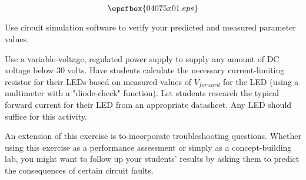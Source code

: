 

$$\epsfbox{04075x01.eps}$$

\vfil \eject






Use circuit simulation software to verify your predicted and measured parameter values.







Use a variable-voltage, regulated power supply to supply any amount of DC voltage below 30 volts.  Have students calculate the necessary current-limiting resistor for their LEDs based on measured values of $V_{forward}$ for the LED (using a multimeter with a "diode-check" function).  Let students research the typical forward current for their LED from an appropriate datasheet.  Any LED should suffice for this activity.

An extension of this exercise is to incorporate troubleshooting questions.  Whether using this exercise as a performance assessment or simply as a concept-building lab, you might want to follow up your students' results by asking them to predict the consequences of certain circuit faults.




